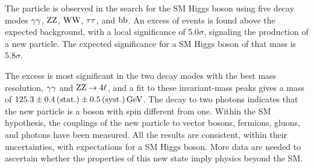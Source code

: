 \documentclass[12pt,twoside,a4paper,cmspaper,final,collab]{cms-tdr}
\begin{document}
The particle is observed in the search for the SM Higgs boson
using five decay modes $\gamma\gamma$, $\mathrm{Z}\mathrm{Z}$, $\mathrm{W}\mathrm{W}$, $\tau\tau$, and $\mathrm{b}\mathrm{b}$.
An excess of events is found above the expected background, with a local significance of
5.0$\sigma$, signaling the production of a new particle.  The expected
significance for a SM Higgs boson of that mass is 5.8$\sigma$.

The excess is most significant in the two decay modes with the best mass resolution, $\gamma\gamma$ and
$\mathrm{Z}\mathrm{Z} \to 4\ell$, and a fit to these invariant-mass peaks gives a mass of $125.3\pm 0.4\,\text{(stat.)}\pm
0.5\,\text{(syst.)}\,\text{Ge\hspace{-.08em}V}$.  The decay to two photons indicates that the new particle is a boson
with spin different from one.
Within the SM hypothesis, the couplings of the new particle to vector bosons, fermions,
gluons, and photons have been measured. All the results are consistent, within their uncertainties, with
expectations for a SM Higgs boson.
More data are needed to ascertain whether the properties of this new state imply physics beyond the SM.
\end{document}
